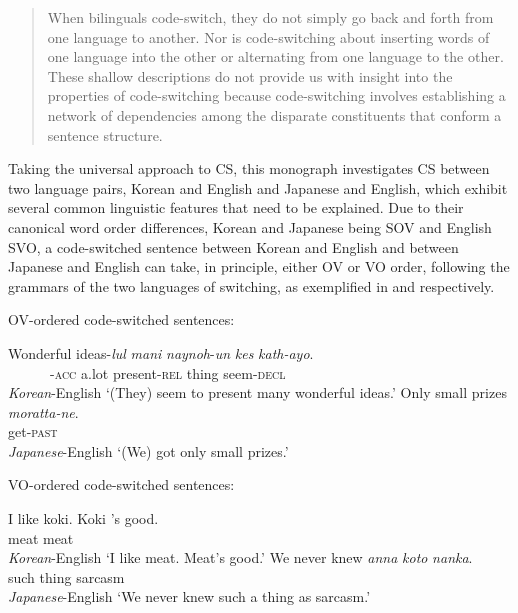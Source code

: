 \begin{quote}
When bilinguals code-switch, they do not simply go back and forth from one language to another. Nor is code-switching about inserting words of one language into the other or alternating from one language to the other. These shallow descriptions do not provide us with insight into the properties of code-switching because code-switching involves establishing a network of dependencies among the disparate constituents that conform a sentence structure.
\end{quote}

Taking the universal approach to \ac{CS}, this monograph investigates \ac{CS} between two language pairs, Korean and English and Japanese and English, which exhibit several common linguistic features that need to be explained. Due to their canonical word order differences, Korean and Japanese being \ac{SOV} and English \ac{SVO}, a code-switched sentence between Korean and English and between Japanese and English can take, in principle, either \ac{OV} or \ac{VO} order, following the grammars of the two languages of switching, as exemplified in  and  respectively.

\newpage

\begin{exe}
\ex\label{ex:3} \acs{OV}-ordered code-switched sentences: 
    \begin{xlist}
        \ex \gll Wonderful ideas-\textit{lul} \textit{mani} \textit{naynoh}-\textit{un}     \textit{kes} \textit{kath-ayo}.\\
        {} {~~~~~~}-\textsc{acc} a.lot present-\textsc{rel} thing seem-\textsc{decl}\\\hfill \hspace*{-5mm}\textit{Korean}-English
        \glt 	‘(They) seem to present many wonderful ideas.’	         \citep{Park1990}
        \ex 
        \gll Only small prizes \textit{moratta-ne}. \\
        {} {} {} get-\textsc{past} \\ \hfill \textit{Japanese}-English
        \glt 	‘(We) got only small prizes.’     \citep{Nishimura1986}
    \end{xlist}
\ex\label{ex:4} \acs{VO}-ordered code-switched sentences:
    \begin{xlist}
        \ex \gll 	I like koki. Koki ’s good. \\
        {} {} meat meat \\  \hfill \textit{Korean}-English
        \glt ‘I like meat. Meat’s good.’           \citep{Choi1991}
        \ex \gll We never knew \textit{anna} \textit{koto} \textit{nanka}. \\
        {} {} {} such thing sarcasm \\   \hfill \textit{Japanese}-English
        \glt 	‘We never knew such a thing as sarcasm.’              \citep{Nishimura1986}
    \end{xlist}
\end{exe}

